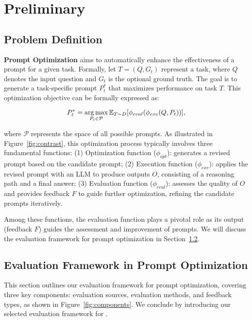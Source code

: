 \section{Preliminary}
\label{sec:pre}

\subsection{Problem Definition} 
\label{sec:problem-formulation}

\textbf{Prompt Optimization} aims to automatically enhance the effectiveness of a prompt for a given task. Formally, let $T = (Q, G_t)$ represent a task, where $Q$ denotes the input question and $G_t$ is the optional ground truth.
The goal is to generate a task-specific prompt $P_t^*$ that maximizes performance on task $T$. This optimization objective can be formally expressed as:

\begin{equation}
P_t^* = \mathop{\arg\max}_{P_t \in \mathcal{P}} \mathbb{E}_{T \sim D}[\phi_{eval}(\phi_{exe}(Q, P_t))],
\end{equation}


where $\mathcal{P}$ represents the space of all possible prompts. As illustrated in Figure~\ref{fig:contrast}, this optimization process typically involves three fundamental functions:
(1) Optimization function ($\phi_{opt}$): generates a revised prompt based on the candidate prompt; 
(2) Execution function ($\phi_{exe}$): applies the revised prompt with an LLM to produce outputs $O$, consisting of a reasoning path and a final answer; 
(3) Evaluation function ($\phi_{eval}$):  assesses the quality of $O$ and provides feedback $F$ to guide further optimization, refining the candidate prompts iteratively.

Among these functions, the evaluation function plays a pivotal role as its output (feedback $F$) guides the assessment and improvement of prompts.
We will discuss the evaluation framework for prompt optimization in Section~\ref{sec:feedback}.



\subsection{Evaluation Framework in  Prompt Optimization}
\label{sec:feedback}

This section outlines our evaluation framework for prompt optimization, covering three key components: evaluation sources, evaluation methods, and feedback types, as shown in Figure~\ref{fig:components}. We conclude by introducing our selected evaluation framework for \ours.


